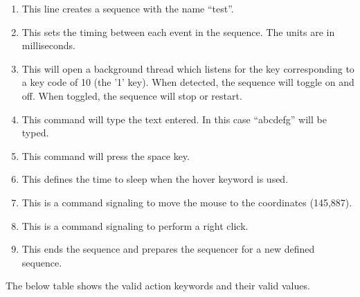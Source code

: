 \begin{enumerate}
	\item {} This line creates a sequence with the name ``test''.
	\item {} This sets the timing between each event in the sequence. The units are in milliseconds.
	\item {} This will open a background thread which listens for the key corresponding to a key code of 10 (the '1' key). When detected, the sequence will toggle on and off. When toggled, the sequence will stop or restart. 
	\item {} This command will type the text entered. In this case ``abcdefg'' will be typed.
	\item {} This command will press the space key.
	\item {} This defines the time to sleep when the hover keyword is used.
	\item {} This is a command signaling to move the mouse to the coordinates (145,887).
	\item {} This is a command signaling to perform a right click.
	\item {} This ends the sequence and prepares the sequencer for a new defined sequence.
\end{enumerate}

The below table shows the valid action keywords and their valid values.


